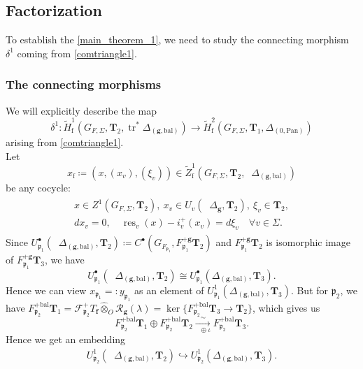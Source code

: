 \documentclass[10pt]{amsart}
\numberwithin{equation}{section}
\theoremstyle{definition}
\theoremstyle{remark} %
\newcommand{\pan}{\mathrm{Pan}}
\DeclareMathOperator{\res}{res}
\DeclareMathOperator{\tr}{{tr}^*}
\renewcommand{\b}{\mathrm{bal}}
\newcommand{\f}{\mathbf{f}}
\newcommand{\scrF}{\mathscr{F}}
\newcommand{\g}{\mathbf{g}}
\newcommand{\p}{\mathfrak{p}}
\newcommand{\R}{\mathcal{R}}
\newcommand{\T}{\mathbf{T}}
\newcommand{\hotimes}{\widehat{\otimes}}
\begin{document}
		
		
		\subsection{Factorization}
		To establish the \cref{main_theorem_1}, we need to study the connecting morphism $ \delta^1 $ coming from \eqref{comtriangle1}.
		\subsubsection{The connecting morphisms}	
		We will explicitly describe the map 
		$$ \delta^1 \colon \widetilde{H}^1_{\mathrm{f}}(G_{F,\Sigma}, \T_2, \operatorname{tr}^*\Delta_{(\g,\b)}) \longrightarrow \widetilde{H}^2_{\mathrm{f}}(G_{F,\Sigma}, \T_1, \Delta_{(0,\pan)}) $$
		arising from \eqref{comtriangle1}. \\
		Let \begin{equation}
			\label{cocyclex_f_rank1}
			x_{\mathrm{f}} \coloneqq (x,(x_v), (\xi_v)) \in \widetilde{Z}^1_{\mathrm{f}}\left( G_{F, \Sigma}, \T_{2}, \tr \Delta_{(\g,\b)}  \right)  
		\end{equation} 
		be any cocycle: 
		\begin{align}
			\begin{aligned}
				x \in Z^1(G_{F,\Sigma}, \T_{2}), \ x_v \in U_v(\tr \Delta_{\g}, \T_{2}), \ \xi_v \in \T_{2},   \\
				dx_v = 0 , \quad \res_v(x)- i^+_v(x_v) = d\xi_v \quad \forall v \in \Sigma. 
			\end{aligned}
		\end{align}
		Since $ U^{\bullet}_{\p_1}(\tr \Delta_{(\g,\b)}, \T_{2}) \coloneqq C^{\bullet}(G_{F_{\p_1}}, F_{\p_1}^{+\g}\T_{2}) $ and $ F_{\p_1}^{+\g}\T_{2} $ is isomorphic image of $ F_{\p_1}^{+\g}\T_{3} $, we have  
		$$ U^{\bullet}_{\p_1}(\tr \Delta_{(\g,\b)}, \T_{2}) \cong U^{\bullet}_{\p_1}(\Delta_{(\g,\b)}, \T_{3}). $$
		Hence we can view $ x_{\p_1} =: y_{\p_1} $ as an element of $ U^1_{\p_1}(\Delta_{(\g,\b)}, \T_{3}) $.	But for $ \p_2 $, we have $ F_{\p_2}^{+\b}\T_{1} = \scrF^+_{\p_2} T_{\f} \hotimes_O \R_\g(\lambda) = \ker\{ F_{\p_2}^{+\b}\T_{3} \rightarrow \T_{2} \} $, which gives us 
		\begin{equation}\label{local_conditions_p2}
			F_{\p_2}^{+\b}\T_{1} \oplus F_{\p_2}^{+\b}\T_{2} \xrightarrow[\tr \oplus \iota]{\sim} F_{\p_2}^{+\b}\T_{3} .
		\end{equation} 
		Hence we get an embedding 
		\begin{align}
			U^{1}_{\p_2}(\tr \Delta_{(\g,\b)}, \T_{2}) \hookrightarrow U^{1}_{\p_2}(\Delta_{(\g,\b)}, \T_{3}).
		\end{align}
\end{document}
